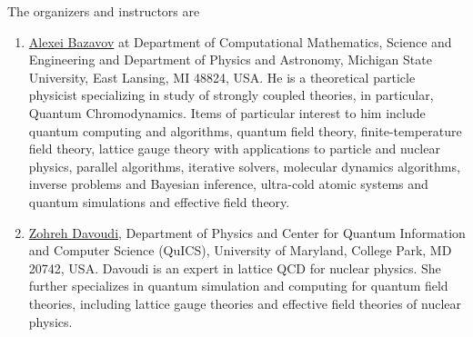 \documentclass[superscriptaddress,amsmath,amssymb,aps,floatfix]{revtex4-2}
\begin{document}
The organizers and instructors are


\begin{enumerate}
\item 
\href{https://directory.natsci.msu.edu/Directory/Profiles/Person/101033}{Alexei
Bazavov} at Department of Computational Mathematics, Science and
Engineering and Department of Physics and Astronomy, Michigan State
University, East Lansing, MI 48824, USA. He is a theoretical particle physicist specializing in study of strongly coupled theories, in particular, Quantum Chromodynamics. Items of particular interest to him include quantum computing and algorithms, quantum field theory, finite-temperature field theory, lattice gauge theory with applications to particle and nuclear physics, parallel algorithms, iterative solvers, molecular dynamics algorithms, inverse problems and Bayesian inference, ultra-cold atomic systems and quantum simulations and effective field theory.

\item
  \href{https://umdphysics.umd.edu/people/faculty/current/item/927-davoudi.html}{Zohreh
  Davoudi}, Department of Physics and Center for Quantum Information and Computer Science (QuICS), University of Maryland, College Park,
  MD 20742, USA. Davoudi is an expert in lattice QCD for nuclear physics. She further
  specializes in quantum simulation and computing for quantum field
  theories, including lattice gauge theories and effective field
  theories of nuclear physics.


\end{enumerate}
\end{document}
